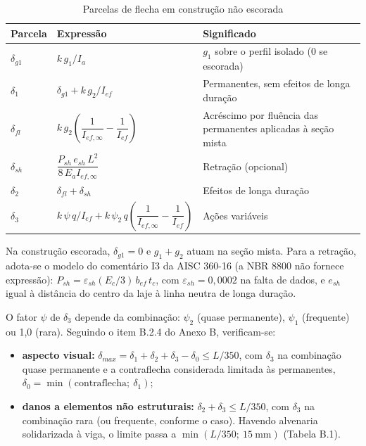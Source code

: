 \begin{table}[htbp]
  \centering
  \caption{Parcelas de flecha em construção não escorada}\label{tab:parcelas-flecha}
  {\small
  \renewcommand{\arraystretch}{1.6}
  \begin{tabularx}{\textwidth}{@{}l l L@{}}
  \toprule
  Parcela & Expressão & Significado \\
  \midrule
  $\delta_{g1}$ & $k\, g_1 / I_a$ & $g_1$ sobre o perfil isolado (0 se escorada) \\
  $\delta_1$ & $\delta_{g1} + k\, g_2 / I_{ef}$ & Permanentes, sem efeitos de longa duração \\
  $\delta_{fl}$ & $k\, g_2\left(\dfrac{1}{I_{ef,\infty}} - \dfrac{1}{I_{ef}}\right)$ & Acréscimo por fluência das permanentes aplicadas à seção mista \\
  $\delta_{sh}$ & $\dfrac{P_{sh}\, e_{sh}\, L^2}{8\, E_a I_{ef,\infty}}$ & Retração (opcional) \\
  $\delta_2$ & $\delta_{fl} + \delta_{sh}$ & Efeitos de longa duração \\
  $\delta_3$ & $k\,\psi\, q / I_{ef} + k\,\psi_2\, q\left(\dfrac{1}{I_{ef,\infty}} - \dfrac{1}{I_{ef}}\right)$ & Ações variáveis \\
  \bottomrule
  \end{tabularx}
  }
\end{table}

Na construção escorada, $\delta_{g1} = 0$ e $g_1 + g_2$ atuam na seção mista. Para a retração, adota-se o modelo do comentário I3 da AISC 360-16 (a NBR 8800 não fornece expressão): $P_{sh} = \varepsilon_{sh} (E_c/3)\, b_{ef}\, t_c$, com $\varepsilon_{sh} = 0{,}0002$ na falta de dados, e $e_{sh}$ igual à distância do centro da laje à linha neutra de longa duração.

O fator $\psi$ de $\delta_3$ depende da combinação: $\psi_2$ (quase permanente), $\psi_1$ (frequente) ou 1,0 (rara). Seguindo o item B.2.4 do Anexo B, verificam-se:
\begin{itemize}
\item \textbf{aspecto visual:} $\delta_{max} = \delta_1 + \delta_2 + \delta_3 - \delta_0 \le L/350$, com $\delta_3$ na combinação quase permanente e a contraflecha considerada limitada às permanentes, $\delta_0 = \min(\text{contraflecha};\ \delta_1)$;
\item \textbf{danos a elementos não estruturais:} $\delta_2 + \delta_3 \le L/350$, com $\delta_3$ na combinação rara (ou frequente, conforme o caso). Havendo alvenaria solidarizada à viga, o limite passa a $\min(L/350;\ 15\ \text{mm})$ (Tabela B.1).
\end{itemize}

